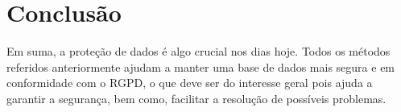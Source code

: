 \section{Conclusão}

Em suma, a proteção de dados é algo crucial nos dias hoje. Todos os métodos referidos anteriormente ajudam a manter uma base de dados mais segura e em conformidade com o \ac{RGPD}, o que deve ser do interesse geral pois ajuda a garantir a segurança, bem como, facilitar a resolução de possíveis problemas. 